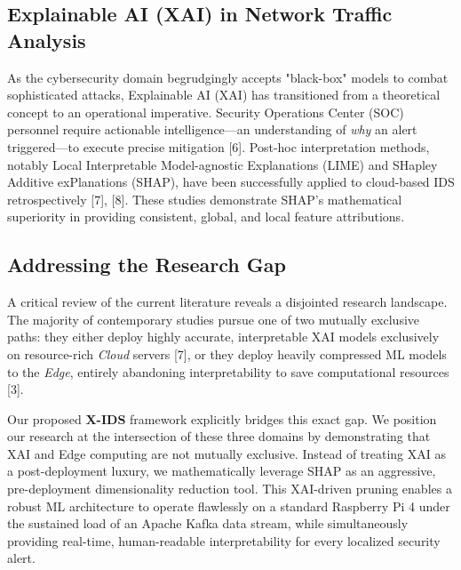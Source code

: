 \subsection{Explainable AI (XAI) in Network Traffic Analysis}
As the cybersecurity domain begrudgingly accepts "black-box" models to combat sophisticated attacks, Explainable AI (XAI) has transitioned from a theoretical concept to an operational imperative. Security Operations Center (SOC) personnel require actionable intelligence—an understanding of \textit{why} an alert triggered—to execute precise mitigation [6]. Post-hoc interpretation methods, notably Local Interpretable Model-agnostic Explanations (LIME) and SHapley Additive exPlanations (SHAP), have been successfully applied to cloud-based IDS retrospectively [7], [8]. These studies demonstrate SHAP's mathematical superiority in providing consistent, global, and local feature attributions.

\subsection{Addressing the Research Gap}
A critical review of the current literature reveals a disjointed research landscape. The majority of contemporary studies pursue one of two mutually exclusive paths: they either deploy highly accurate, interpretable XAI models exclusively on resource-rich \textit{Cloud} servers [7], or they deploy heavily compressed ML models to the \textit{Edge}, entirely abandoning interpretability to save computational resources [3].

Our proposed \textbf{X-IDS} framework explicitly bridges this exact gap. We position our research at the intersection of these three domains by demonstrating that XAI and Edge computing are not mutually exclusive. Instead of treating XAI as a post-deployment luxury, we mathematically leverage SHAP as an aggressive, pre-deployment dimensionality reduction tool. This XAI-driven pruning enables a robust ML architecture to operate flawlessly on a standard Raspberry Pi 4 under the sustained load of an Apache Kafka data stream, while simultaneously providing real-time, human-readable interpretability for every localized security alert.
